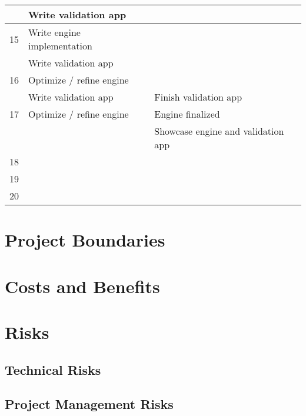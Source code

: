 \documentclass{article}
\begin{document}
\begin{longtable}{|l|p{}|p{}|}
                         & Write validation app                      &                                         \\ \hline
    15                   & Write engine implementation               &                                         \\ \hline
                         & Write validation app                      &                                         \\ \hline
    16                   & Optimize / refine engine                  &                                         \\ \hline
                         & Write validation app                      & Finish validation app                   \\ \hline
    17                   & Optimize / refine engine                  & Engine finalized                        \\ \hline
                         &                                           & Showcase engine and validation app      \\ \hline
    18                   &                                           &                                         \\ \hline
    19                   &                                           &                                         \\ \hline
    20                   &                                           &                                         \\ \hline
\end{longtable}
\newpage

\newpage
\section{Project Boundaries}


\newpage
\section{Costs and Benefits}


\newpage
\section{Risks}
\subsection{Technical Risks}
\subsection{Project Management Risks}
\end{document}
